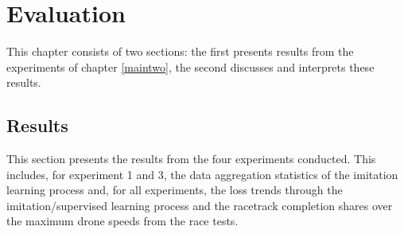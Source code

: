 \chapter{Evaluation}
\label{evaluation}
This chapter consists of two sections:
the first presents results from the experiments of chapter \ref{maintwo},
the second discusses and interprets these results.


\section{Results}
\label{results}
\providecommand{\gfxwidth}{}\renewcommand{\gfxwidth}{0.8\textwidth}
This section presents the results from the four experiments conducted.
This includes, for experiment 1 and 3, the data aggregation statistics of the imitation learning process
and, for all experiments, the loss trends through the imitation/supervised learning process
and the racetrack completion shares over the maximum drone speeds from the race tests.


